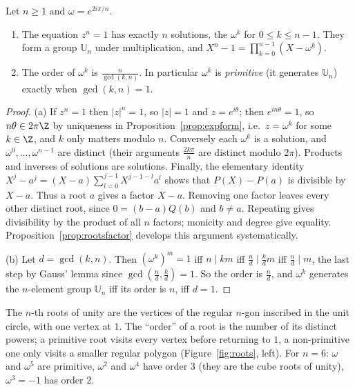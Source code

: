 \begin{proposition}\label{prop:roots}
Let $n\ge1$ and $\omega=e^{2i\pi/n}$.
\begin{enumerate}[label=(\alph*)]
\item The equation $z^n=1$ has exactly $n$ solutions, the $\omega^k$ for $0\le k\le n-1$. They form a group $\mathbb U_n$ under multiplication, and
$X^n-1=\prod_{k=0}^{n-1}\left(X-\omega^k\right)$.
\item The order of $\omega^k$ is $\frac n{\gcd(k,n)}$. In particular $\omega^k$ is \emph{primitive} (it generates $\mathbb U_n$) exactly when $\gcd(k,n)=1$.
\end{enumerate}
\end{proposition}
\begin{proof}
(a) If $z^n=1$ then $|z|^n=1$, so $|z|=1$ and $z=e^{i\theta}$; then $e^{in\theta}=1$, so $n\theta\in2\pi\Z$ by uniqueness in Proposition~\ref{prop:expform}, i.e.\ $z=\omega^k$ for some $k\in\Z$, and $k$ only matters modulo $n$. Conversely each $\omega^k$ is a solution, and $\omega^0,\dots,\omega^{n-1}$ are distinct (their arguments $\frac{2k\pi}n$ are distinct modulo $2\pi$). Products and inverses of solutions are solutions. Finally, the elementary identity $X^j-a^j=(X-a)\sum_{l=0}^{j-1}X^{j-1-l}a^l$ shows that $P(X)-P(a)$ is divisible by $X-a$. Thus a root $a$ gives a factor $X-a$. Removing one factor leaves every other distinct root, since $0=(b-a)Q(b)$ and $b\ne a$. Repeating gives divisibility by the product of all $n$ factors; monicity and degree give equality. Proposition~\ref{prop:rootsfactor} develops this argument systematically.

(b) Let $d=\gcd(k,n)$. Then $(\omega^k)^m=1$ iff $n\mid km$ iff $\frac nd\mid\frac kd m$ iff $\frac nd\mid m$, the last step by Gauss' lemma since $\gcd\!\left(\frac nd,\frac kd\right)=1$. So the order is $\frac nd$, and $\omega^k$ generates the $n$-element group $\mathbb U_n$ iff its order is $n$, iff $d=1$.
\end{proof}

The $n$-th roots of unity are the vertices of the regular $n$-gon inscribed in the unit circle, with one vertex at $1$. The ``order'' of a root is the
number of its distinct powers; a primitive root visits every vertex before returning to $1$, a non-primitive one only visits a smaller regular polygon
(Figure~\ref{fig:roots}, left). For $n=6$: $\omega$ and $\omega^5$ are primitive, $\omega^2$ and $\omega^4$ have order $3$ (they are the cube roots of unity),
$\omega^3=-1$ has order $2$.

